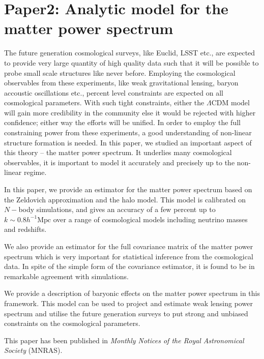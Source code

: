 \chapter{Paper2: Analytic model for the matter power spectrum}\label{paper:analyticmodel}

The future generation cosmological surveys, like Euclid, 
LSST etc., are expected to provide
very large quantity of high quality data such that it will be 
possible to probe small scale structures like never before. Employing 
the cosmological observables from these experiments,
like weak gravitational lensing, baryon accoustic oscillations etc., 
percent level constraints are expected on all cosmological 
parameters. With such tight
constraints, either the $\Lambda$CDM model will gain more credibility
in the community else it would be rejected with higher confidence; either 
way the efforts will be unified. 
In order to employ the full constraining power from these experiments, a good
understanding of non-linear structure formation is needed.
In this paper, we studied an important aspect of this theory -- 
the matter power spectrum. It underlies
many cosmological observables, it is important
to model it accurately and precisely up to the non-linear regime. 

In this paper, we provide an estimator for the matter
power spectrum based on the Zeldovich approximation and the halo model. 
This model is calibrated on $N-$body simulations, and gives
an accuracy of a few percent up to $k\sim 0.8 h^{-1}\mathrm{Mpc}$ 
over a range of cosmological models 
including neutrino masses and redshifts. 

We also provide an estimator for the full covariance matrix of the matter power
spectrum which is very important for statistical inference from the cosmological
data. In spite of the simple form of the covariance estimator, it is found
to be in remarkable agreement with simulations. 

We provide a description of baryonic effects on the matter
power spectrum in this framework. This model can be used to project and estimate
weak lensing power spectrum and utilise the future generation surveys
to put strong and unbiased constraints on the cosmological parameters.

This paper has been published in {\it Monthly Notices of the Royal Astronomical
Society} (MNRAS). 

\clearpage
